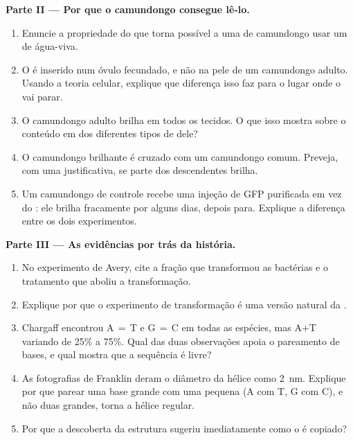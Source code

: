 \begin{problem}
\medskip
\noindent\textbf{Parte II --- Por que o camundongo consegue lê-lo.}
\begin{enumerate}[resume]
  \item Enuncie a propriedade do  que torna possível a uma  de
        camundongo usar um  de água-viva.
  \item O  é inserido num óvulo fecundado, e não na pele de um
        camundongo adulto. Usando a teoria celular, explique que
        diferença isso faz para o lugar onde o  vai parar.
  \item O camundongo adulto brilha em todos os tecidos. O que isso
        mostra sobre o conteúdo em  dos diferentes tipos de 
        dele?
  \item O camundongo brilhante é cruzado com um camundongo comum.
        Preveja, com uma justificativa, se parte dos descendentes
        brilha.
  \item Um camundongo de controle recebe uma injeção de  GFP
        purificada em vez do : ele brilha fracamente por alguns
        dias, depois para. Explique a diferença entre os dois
        experimentos.
\end{enumerate}

\medskip
\noindent\textbf{Parte III --- As evidências por trás da história.}
\begin{enumerate}[resume]
  \item No experimento de Avery, cite a fração que transformou as
        bactérias e o tratamento que aboliu a transformação.
  \item Explique por que o experimento de transformação é uma versão
        natural da .
  \item Chargaff encontrou A$\,=\,$T e G$\,=\,$C em todas as espécies,
        mas A+T variando de 25\% a 75\%. Qual das duas observações
        apoia o pareamento de bases, e qual mostra que a sequência é
        livre?
  \item As fotografias de Franklin deram o diâmetro da hélice como
        \qty{2}{nm}. Explique por que parear uma base grande com uma
        pequena (A com T, G com C), e não duas grandes, torna a hélice
        regular.
  \item Por que a descoberta da estrutura sugeriu imediatamente como o
         é copiado?
\end{enumerate}


\end{problem}
